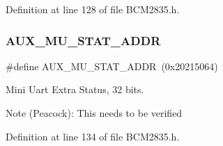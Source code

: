 Definition at line 128 of file B\+C\+M2835.\+h.

\mbox{\label{group__UART_ga3ab600905dcef74e8756dcc8d54c6ef9}} 
\subsubsection{\texorpdfstring{A\+U\+X\+\_\+\+M\+U\+\_\+\+S\+T\+A\+T\+\_\+\+A\+D\+DR}{AUX\_MU\_STAT\_ADDR}}
{\footnotesize\ttfamily \#define A\+U\+X\+\_\+\+M\+U\+\_\+\+S\+T\+A\+T\+\_\+\+A\+D\+DR~(0x20215064)}



Mini Uart Extra Status, 32 bits. 

\begin{DoxyNote}{Note}
(Peacock)\+: This needs to be verified 
\end{DoxyNote}


Definition at line 134 of file B\+C\+M2835.\+h.

